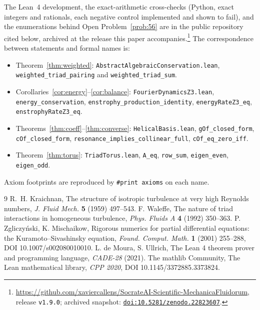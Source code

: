\documentclass[11pt]{amsart}
\theoremstyle{plain}
\theoremstyle{definition}
\theoremstyle{remark}
\begin{document}
The Lean~4 development, the exact-arithmetic cross-checks (Python, exact integers and rationals,
each negative control implemented and shown to fail), and the enumerations behind Open
Problem~\ref{prob:56} are in the public repository cited below, archived at the release this
paper accompanies.\footnote{\url{https://github.com/xaviercallens/SocrateAI-Scientific-MechanicaFluidorum},
release \texttt{v1.9.0}; archived snapshot: \href{https://doi.org/10.5281/zenodo.22823607}{\texttt{doi:10.5281/zenodo.22823607}}.}
The correspondence between statements and formal names is:
\begin{itemize}[leftmargin=*,itemsep=1pt]
\raggedright
\item Theorem~\ref{thm:weighted}: \texttt{AbstractAlgebraicConservation.lean},
  \texttt{weighted\_triad\_pairing} and \texttt{weighted\_triad\_sum}.
\item Corollaries~\ref{cor:energy}--\ref{cor:balance}: \texttt{FourierDynamicsZ3.lean},
  \texttt{energy\_conservation}, \texttt{enstrophy\_production\_identity},
  \texttt{energyRateZ3\_eq}, \texttt{enstrophyRateZ3\_eq}.
\item Theorems~\ref{thm:coeff}--\ref{thm:converse}: \texttt{HelicalBasis.lean},
  \texttt{gOf\_closed\_form}, \texttt{cOf\_closed\_form},
  \texttt{resonance\_implies\_collinear\_full}, \texttt{cOf\_eq\_zero\_iff}.
\item Theorem~\ref{thm:torus}: \texttt{TriadTorus.lean}, \texttt{A\_eq}, \texttt{row\_sum},
  \texttt{eigen\_even}, \texttt{eigen\_odd}.
\end{itemize}
Axiom footprints are reproduced by \texttt{\#print axioms} on each name.

\begin{thebibliography}{9}
 R.~H. Kraichnan, The structure of isotropic turbulence at very high
Reynolds numbers, \emph{J. Fluid Mech.} \textbf{5} (1959) 497--543.
 F. Waleffe, The nature of triad interactions in homogeneous turbulence,
\emph{Phys. Fluids A} \textbf{4} (1992) 350--363.
 P. Zgliczy\'nski, K. Mischaikow, Rigorous numerics for partial
differential equations: the Kuramoto--Sivashinsky equation, \emph{Found. Comput. Math.}
\textbf{1} (2001) 255--288, DOI 10.1007/s002080010010.
 L. de Moura, S. Ullrich, The Lean 4 theorem prover and programming language,
\emph{CADE-28} (2021).
 The mathlib Community, The Lean mathematical library, \emph{CPP 2020},
DOI 10.1145/3372885.3373824.
\end{thebibliography}
\end{document}
